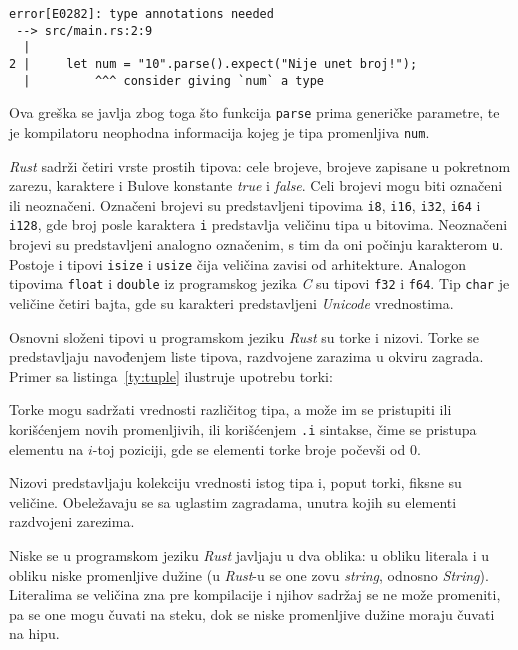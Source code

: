 \documentclass[12pt,oneside]{memoir}
\begin{document}
\begin{lstlisting}[language={}, style=text]
error[E0282]: type annotations needed
 --> src/main.rs:2:9
  |
2 |     let num = "10".parse().expect("Nije unet broj!");
  |         ^^^ consider giving `num` a type
\end{lstlisting}

\noindent
Ova greška se javlja zbog toga što funkcija \texttt{parse}
prima generičke parametre, te je kompilatoru neophodna informacija
kojeg je tipa promenljiva \texttt{num}.

\emph{Rust} sadrži četiri vrste prostih tipova: cele brojeve,
brojeve zapisane u pokretnom zarezu, karaktere i Bulove
konstante \emph{true} i \emph{false}. Celi brojevi mogu biti
označeni ili neoznačeni. Označeni brojevi su predstavljeni
tipovima \texttt{i8}, \texttt{i16}, \texttt{i32}, \texttt{i64} i
\texttt{i128}, gde broj posle karaktera \texttt{i} predstavlja
veličinu tipa u bitovima. Neoznačeni brojevi su predstavljeni
analogno označenim, s tim da oni počinju karakterom \texttt{u}.
Postoje i tipovi \texttt{isize} i \texttt{usize} čija veličina
zavisi od arhitekture.
Analogon tipovima \texttt{float} i \texttt{double} iz programskog
jezika \emph{C} su tipovi \texttt{f32} i \texttt{f64}. Tip
\texttt{char} je veličine četiri bajta, gde su karakteri predstavljeni
\emph{Unicode} vrednostima.

Osnovni složeni tipovi u programskom jeziku \emph{Rust} su torke
i nizovi. Torke se predstavljaju navođenjem liste tipova, razdvojene zarazima u okviru
zagrada. Primer sa listinga~\ref{ty:tuple} ilustruje upotrebu torki:



Torke mogu sadržati vrednosti različitog tipa, a može im se pristupiti
ili korišćenjem novih promenljivih, ili korišćenjem \texttt{.i} sintakse,
čime se pristupa elementu na $i$-toj poziciji, gde se elementi torke broje
počevši od $0$.

Nizovi predstavljaju kolekciju vrednosti istog tipa i, poput torki,
fiksne su veličine. Obeležavaju se sa uglastim zagradama, unutra kojih su elementi
razdvojeni zarezima.

Niske se u programskom jeziku \emph{Rust} javljaju u dva oblika:
u obliku literala i u obliku niske promenljive dužine
(u \emph{Rust}-u se one zovu \emph{string}, odnosno \emph{String}).
Literalima se veličina zna pre kompilacije i njihov sadržaj se ne može promeniti,
pa se one mogu čuvati na steku, dok se niske promenljive dužine moraju čuvati na hipu.
\end{document}
